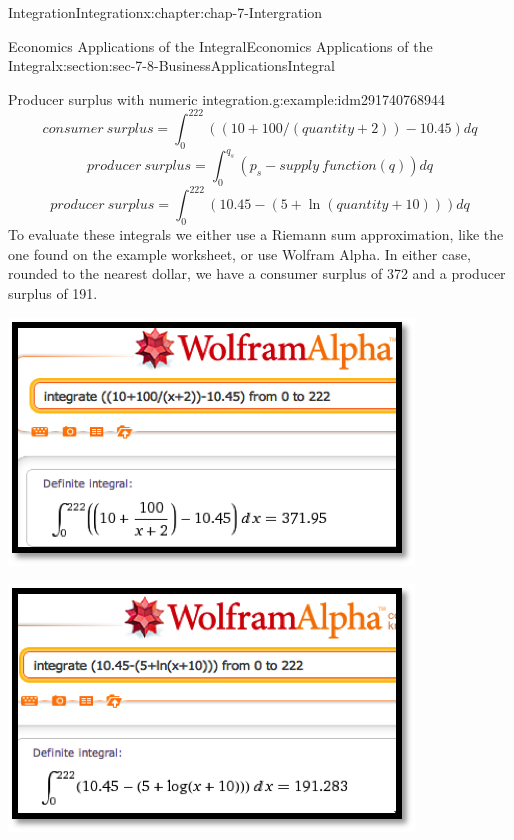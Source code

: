 \documentclass[oneside,10pt,]{book}
\numberwithin{equation}{section}
\begin{document}
\begin{chapterptx}{Integration}{}{Integration}{}{}{x:chapter:chap-7-Intergration}
\begin{sectionptx}{Economics Applications of the Integral}{}{Economics Applications of the Integral}{}{}{x:section:sec-7-8-BusinessApplicationsIntegral}
\begin{example}{Producer surplus with numeric integration.}{g:example:idm291740768944}
\begin{equation*}
\end{equation*}
%
\begin{equation*}
consumer\ surplus= \int_0^{222} ((10+100/(quantity+2))- 10.45)  dq
\end{equation*}
%
\begin{equation*}
producer\ surplus=\int_0^{q_s} ( p_s-supply\ function(q))  dq
\end{equation*}
%
\begin{equation*}
producer\ surplus=\int_0^{222} ( 10.45-(5+\ln (quantity+10)))  dq
\end{equation*}
To evaluate these integrals we either use a Riemann sum approximation, like the one found on the example worksheet, or use Wolfram Alpha.  In either case, rounded to the nearest dollar, we have a consumer surplus of \textdollar{}372 and a producer surplus of \textdollar{}191.%
\begin{sidebyside}{1}{0.3}{0.3}{0}%
\begin{sbspanel}{0.4}%
\includegraphics[width=\linewidth]{images/sec7-8-6.png}
\end{sbspanel}%
\end{sidebyside}%
\begin{sidebyside}{1}{0.3}{0.3}{0}%
\begin{sbspanel}{0.4}%
\includegraphics[width=\linewidth]{images/sec7-8-7.png}

\end{sbspanel}
\end{sidebyside}
\end{example}
\end{sectionptx}
\end{chapterptx}
\end{document}
